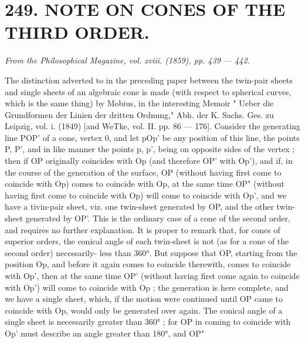 \documentclass[11pt,a4paper]{book}
\begin{document}
\section*{249. NOTE    ON    CONES    OF    THE    THIRD    ORDER.}
\begin{flushright}
\textit{From  the  Philosophical  Magazine,  vol.  xviii.  (1859),  pp.  439 — 442.}\n\end{flushright}
\vspace{0.5em}
The  distinction  adverted  to  in  the  preceding  paper  between  the  twin-pair  sheets  and
single  sheets  of  an  algebraic  cone  is  made  (with  respect  to  spherical  curves,  which  is  the
same  thing)  by  Mobius,  in  the  interesting  Memoir  "  Ueber  die  Grundformen  der  Linien
der  dritten  Ordnung,"  Abh.  der  K.  Sachs.  Ges.  zu  Leipzig,  vol.  i.  (1849)  [and  WeTke,
vol.  II.  pp.  86 — 176].  Consider  the  generating  line  POP'  of  a  cone,  vertex  0,  and  let
pOp'  be  any  position  of  this  line,  the  points  P,  P',  and  in  like  manner  the  points  p,  p',
being  on  opposite  sides  of  the  vertex ;  then  if  OP  originally  coincides  with  Op  (and
therefore  OP'  with  Op'),  and  if,  in  the  course  of  the  generation  of  the  surface,  OP
(without  having  first  come  to  coincide  with  Op)  comes  to  coincide  with  Op,  at  the  same
time  OP"  (without  having  first  come  to  coincide  with  Op)  will  come  to  coincide  with  Op',
and  we  have  a  tivin-pair  sheet,  viz.  one  twin-sheet  generated  by  OP,  and  the  other  twin-
sheet  generated  by  OP'.  This  is  the  ordinary  case  of  a  cone  of  the  second  order,  and
requires  no  further  explanation.  It  is  proper  to  remark  that,  for  cones  of  superior  orders,
the  conical  angle  of  each  twin-sheet  is  not  (as  for  a  cone  of  the  second  order)  necessarily-
less  than  360°.  But  suppose  that  OP,  starting  from  the  position  Op,  and  before  it
again  comes  to  coincide  therewith,  comes  to  coincide  with  Op',  then  at  the  same  time
OP'  (without  having  first  come  again  to  coincide  with  Op')  will  come  to  coincide  with
Op ;  the  generation  is  here  complete,  and  we  have  a  single  sheet,  which,  if  the  motion
were  continued  until  OP  came  to  coincide  with  Op,  would  only  be  generated  over
again.  The  conical  angle  of  a  single  sheet  is  necessarily  greater  than  360° ;  for  OP
in  coming  to  coincide  with  Op'  must  describe  an  angle  greater  than  180°,  and  OP"
\end{document}
